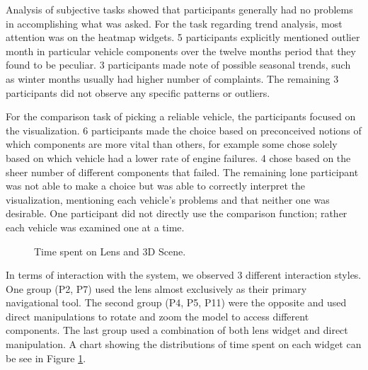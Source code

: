 Analysis of subjective tasks showed that participants generally had no problems
in accomplishing what was asked. For the task regarding trend analysis, most
attention was on the heatmap widgets. 5 participants explicitly mentioned
outlier month in particular vehicle components over the twelve months period
that they found to be peculiar. 3 participants made note of possible seasonal trends,
such as winter months usually had higher number of complaints. The remaining 3
participants did not observe any specific patterns or outliers. 

For the comparison task of picking a reliable vehicle, the participants
focused on the \threed visualization. 6 participants made the choice based on
preconceived notions of which components are more vital than others, for example
some chose solely based on which vehicle had a lower rate of engine failures. 4
chose based on the sheer number of different components that failed. The
remaining lone participant was not able to make a choice but was able to
correctly interpret the visualization, mentioning each vehicle's problems
and that neither one was desirable. One participant did not directly use the
comparison function; rather each vehicle was examined one at a time.


 
\begin{figure}
\caption{Time spent on Lens and 3D Scene.}
\label{chart:usage}     
\end{figure}
  
   
In terms of interaction with the system, we observed 3 different
interaction styles. One group (P2, P7) used the lens almost exclusively
as their primary navigational tool. The second group (P4, P5, P11) were the
opposite and used direct manipulations to rotate and zoom the \threed model to
access different components. The last group used a combination of both lens
widget and direct manipulation. A chart showing the distributions of time spent
on each widget can be see in Figure \ref{chart:usage}.


